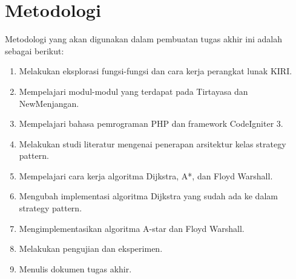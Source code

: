 \section{Metodologi}
\label{sec:metlit}
Metodologi yang akan digunakan dalam pembuatan tugas akhir ini adalah sebagai berikut:
	\begin{enumerate}
		\item Melakukan eksplorasi fungsi-fungsi dan cara kerja perangkat lunak KIRI.
		\item Mempelajari modul-modul yang terdapat pada Tirtayasa dan NewMenjangan.
		\item Mempelajari bahasa pemrograman PHP dan framework CodeIgniter 3.
		\item Melakukan studi literatur mengenai penerapan arsitektur kelas strategy pattern.
    		\item Mempelajari cara kerja algoritma Dijkstra, A*, dan Floyd Warshall.
    		\item Mengubah implementasi algoritma Dijkstra yang sudah ada ke dalam strategy pattern.
    		\item Mengimplementasikan algoritma A-star dan Floyd Warshall.
    		\item Melakukan pengujian dan eksperimen.
    		\item Menulis dokumen tugas akhir.
	\end{enumerate}

